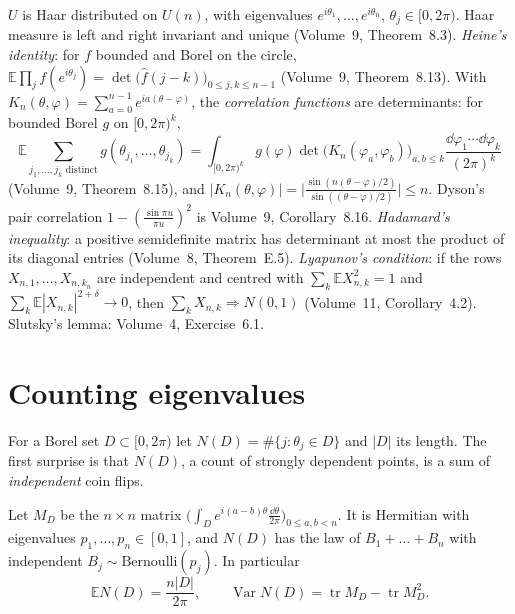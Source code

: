 \begin{reminder}
$U$ is Haar distributed on $U(n)$, with eigenvalues $e^{i\theta_1},\dots,e^{i\theta_n}$, $\theta_j\in[0,2\pi)$. Haar measure is left and right invariant and unique (Volume~9, Theorem~8.3). \emph{Heine's identity}: for $f$ bounded and
Borel on the circle, $\mathbb E\prod_jf(e^{i\theta_j})=\det\bigl(\hat f(j-k)\bigr)_{0\le j,k\le n-1}$ (Volume~9, Theorem~8.13). With $K_n(\theta,\varphi)=\sum_{a=0}^{n-1}e^{ia(\theta-\varphi)}$, the \emph{correlation functions} are determinants: for bounded Borel
$g$ on $[0,2\pi)^k$,
\[
\mathbb E\sum_{j_1,\dots,j_k\text{ distinct}}g(\theta_{j_1},\dots,\theta_{j_k})=\int_{[0,2\pi)^k}g(\varphi)\det\bigl(K_n(\varphi_a,\varphi_b)\bigr)_{a,b\le k}\frac{\dd\varphi_1\cdots\dd\varphi_k}{(2\pi)^k}
\]
(Volume~9, Theorem~8.15), and $|K_n(\theta,\varphi)|=\bigl|\frac{\sin(n(\theta-\varphi)/2)}{\sin((\theta-\varphi)/2)}\bigr|\le n$. Dyson's pair correlation $1-(\frac{\sin\pi u}{\pi u})^2$ is Volume~9, Corollary~8.16. \emph{Hadamard's inequality}: a positive semidefinite
matrix has determinant at most the product of its diagonal entries (Volume~8, Theorem~E.5). \emph{Lyapunov's condition}: if the rows $X_{n,1},\dots,X_{n,k_n}$ are independent and centred with $\sum_k\mathbb EX_{n,k}^2=1$ and
$\sum_k\mathbb E|X_{n,k}|^{2+\delta}\to0$, then $\sum_kX_{n,k}\Rightarrow N(0,1)$ (Volume~11, Corollary~4.2). Slutsky's lemma: Volume~4, Exercise~6.1.
\end{reminder}

\section{Counting eigenvalues}

For a Borel set $D\subset[0,2\pi)$ let $N(D)=\#\{j:\theta_j\in D\}$ and $|D|$ its length. The first surprise is that $N(D)$, a count of strongly dependent points, is a sum of \emph{independent} coin flips.

\begin{proposition}\label{prop:bernoulli}
Let $M_D$ be the $n\times n$ matrix $\bigl(\int_De^{i(a-b)\theta}\frac{\dd\theta}{2\pi}\bigr)_{0\le a,b<n}$. It is Hermitian with eigenvalues $p_1,\dots,p_n\in[0,1]$, and $N(D)$ has the law of $B_1+\dots+B_n$ with independent $B_j\sim\mathrm{Bernoulli}(p_j)$. In particular
\[
\mathbb EN(D)=\frac{n|D|}{2\pi},\qquad\operatorname{Var}N(D)=\operatorname{tr}M_D-\operatorname{tr}M_D^2.
\]
\end{proposition}

